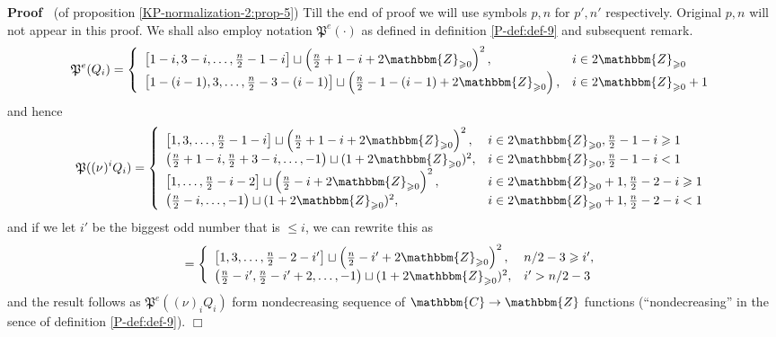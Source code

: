 \documentclass{article}
\newenvironment{proof}{\noindent\textbf{Proof\ }}{\hspace*{\fill}$\Box$\medskip}
\numberwithin{definition}{section}
\numberwithin{lemma}{section}
\numberwithin{proposition}{section}
{\theorembodyfont{\rmfamily}\newtheorem{remark}{Remark}
\numberwithin{remark}{section}
}
\begin{document}
\begin{proof}
  (of proposition \ref{KP-normalization-2:prop-5}) Till the end of proof we
  will use symbols $p, n$ for $p', n'$ respectively. Original $p, n$ will not
  appear in this proof. We shall also employ notation $\mathfrak{P}^e (
  \cdot)$ as defined in definition \ref{P-def:def-9} and subsequent remark.
  \[ \mathfrak{P}^e ( Q_i) = \left\{ \begin{array}{ll}
       \left[ 1 - i, 3 - i, \ldots, \frac{n}{2} - 1 - i \right] \sqcup \left(
       \frac{n}{2} + 1 - i + 2\mathbbm{Z}_{\geqslant 0} \right)^2, & i \in
       2\mathbbm{Z}_{\geqslant 0}\\
       \left[ 1 - ( i - 1), 3, \ldots, \frac{n}{2} - 3 - ( i - 1) \right]
       \sqcup \left( \frac{n}{2} - 1 - ( i - 1) + 2\mathbbm{Z}_{\geqslant 0}
       \right), & i \in 2\mathbbm{Z}_{\geqslant 0} + 1
     \end{array} \right. \]
  and hence
  \[ \mathfrak{P} ( ( \nu^{})^i Q_i) = \left\{ \begin{array}{ll}
       \left[ 1, 3, \ldots, \frac{n}{2} - 1 - i \right] \sqcup \left(
       \frac{n}{2} + 1 - i + 2\mathbbm{Z}_{\geqslant 0} \right)^2, & i \in
       2\mathbbm{Z}_{\geqslant 0}, \frac{n}{2} - 1 - i \geqslant 1\\
       \left( \frac{n}{2} + 1 - i, \frac{n}{2} + 3 - i, \ldots, - 1 \right)
       \sqcup ( 1 + 2\mathbbm{Z}_{\geqslant 0})^2, & i \in
       2\mathbbm{Z}_{\geqslant 0}, \frac{n}{2} - 1 - i < 1\\
       \left[ 1, \ldots, \frac{n}{2} - i - 2 \right] \sqcup \left( \frac{n}{2}
       - i + 2\mathbbm{Z}_{\geqslant 0} \right)^2, & i \in
       2\mathbbm{Z}_{\geqslant 0} + 1, \frac{n}{2} - 2 - i \geqslant 1\\
       \left( \frac{n}{2} - i, \ldots, - 1 \right) \sqcup ( 1 +
       2\mathbbm{Z}_{\geqslant 0})^2, & i \in 2\mathbbm{Z}_{\geqslant 0} + 1,
       \frac{n}{2} - 2 - i < 1
     \end{array} \right. \]
  and if we let $i'$ be the biggest odd number that is $\leqslant i$, we can
  rewrite this as
  \[ = \left\{ \begin{array}{ll}
       \left[ 1, 3, \ldots, \frac{n}{2} - 2 - i' \right] \sqcup \left(
       \frac{n}{2} - i' + 2\mathbbm{Z}_{\geqslant 0} \right)^2, & n / 2 - 3
       \geqslant i',\\
       \left( \frac{n}{2} - i', \frac{n}{2} - i' + 2, \ldots, - 1 \right)
       \sqcup ( 1 + 2\mathbbm{Z}_{\geqslant 0})^2, & i' > n / 2 - 3
     \end{array} \right. \]
  and the result follows as $\mathfrak{P}^e ( ( \nu)^{}_i Q_i)$ form
  nondecreasing sequence of $\mathbbm{C} \rightarrow \mathbbm{Z}$ functions
  (``nondecreasing'' in the sence of definition \ref{P-def:def-9}).
\end{proof}
\end{document}
